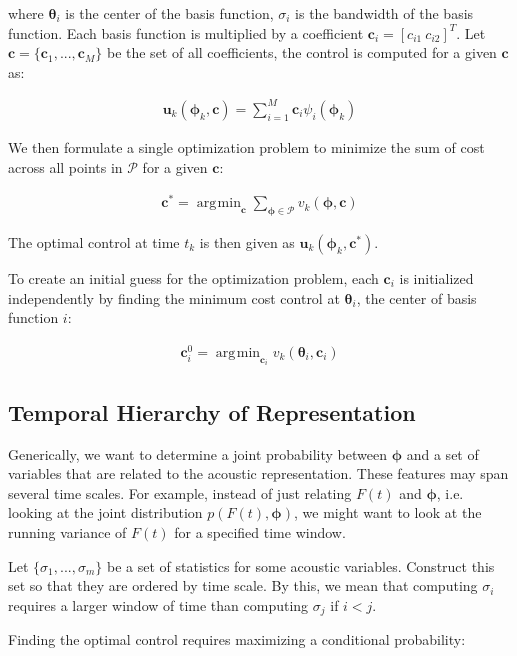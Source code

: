 \documentclass{article} %
\DeclareMathOperator*{\argmin}{\arg\!\min}
\begin{document}
where $\bm{\theta}_i$ is the center of the basis function, $\sigma_i$ is the bandwidth of
the basis function. Each basis function is multiplied by a coefficient
$\bm{c}_i = \left[ c_{i1} ~ c_{i2} \right]^T$. Let $\bm{c}=\{\bm{c}_1, ... ,\bm{c}_M \}$
be the set of all coefficients, the control is computed for a given $\bm{c}$ as:

\begin{align*}
\bm{u}_k(\bm{\phi}_k, \bm{c}) = \sum_{i=1}^M \bm{c}_i \psi_i(\bm{\phi}_k)
\end{align*}

We then formulate a single optimization problem to minimize the sum of cost
across all points in $\mathcal{P}$ for a given $\bm{c}$:

\begin{align*}
\bm{c}^* = \argmin_{\bm{c}} \sum_{\bm{\phi} \in \mathcal{P}} v_k( \bm{\phi}, \bm{c} )
\end{align*}

The optimal control at time $t_k$ is then given as $\bm{u}_k(\bm{\phi}_k, \bm{c}^*)$.

To create an initial guess for the optimization problem, each $\bm{c}_i$ is initialized
independently by finding the minimum cost control at $\bm{\theta}_i$, the center of
basis function $i$:
   
\begin{align*}
\bm{c}_i^0 = \argmin_{\bm{c}_i} v_k( \bm{\theta}_i, \bm{c}_i )
\end{align*}


\iffalse
\subsection{Temporal Hierarchy of Representation}

Generically, we want to determine a joint probability between $\bm{\phi}$ and a set of
variables that are related to the acoustic representation. These features may span several
time scales. For example, instead of just relating $F(t)$ and $\bm{\phi}$, i.e. looking
at the joint distribution $p \left( F(t), \bm{\phi} \right)$, we might want to look
at the running variance of $F(t)$ for a specified time window.

Let $\{ \sigma_1, ..., \sigma_m \}$ be a set of statistics for some acoustic variables. Construct
this set so that they are ordered by time scale. By this, we mean that computing $\sigma_i$
requires a larger window of time than computing $\sigma_j$ if $i < j$.

Finding the optimal control requires maximizing a conditional probability:
\end{document}
